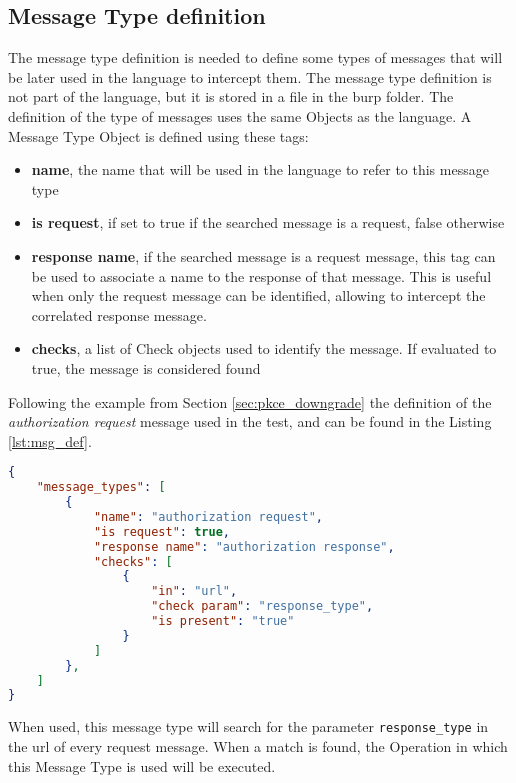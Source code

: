 \subsection{Message Type definition}
The message type definition is needed to define some types of messages that will be later used in the language to intercept them.
The message type definition is not part of the language, but it is stored in a file in the \Gls{burp} folder. The definition of the type of messages uses the same Objects as the language.
A Message Type Object is defined using these tags:
\begin{itemize}
    \item \textbf{name}, the name that will be used in the language to refer to this message type
    \item \textbf{is request}, if set to true if the searched message is a request, false otherwise
    \item \textbf{response name}, if the searched message is a request message, this tag can be used to associate a name to the response of that message. This is useful when only the request message can be identified, allowing to intercept the correlated response message.
    \item \textbf{checks}, a list of Check objects used to identify the message. If evaluated to true, the message is considered found
\end{itemize}

Following the example from Section \ref{sec:pkce_downgrade} the definition of the \textit{authorization request} message used in the test, and can be found in the Listing \ref{lst:msg_def}.

\begin{lstlisting}[language=json, caption=Message Types definition, label={lst:msg_def}]
{
    "message_types": [
        {
            "name": "authorization request",
            "is request": true,
            "response name": "authorization response",
            "checks": [
                {
                    "in": "url",
                    "check param": "response_type",
                    "is present": "true"
                }
            ]
        },
    ]
}
\end{lstlisting}

When used, this message type will search for the parameter \texttt{response\_type} in the url of every request message. When a match is found, the Operation in which this Message Type is used will be executed.

